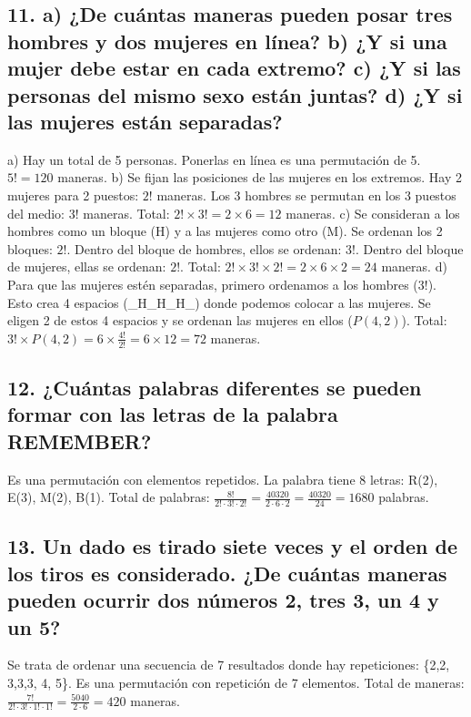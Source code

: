 \documentclass[11pt]{article}
\begin{document}
    \subsection*{11. a) ¿De cuántas maneras pueden posar tres hombres y dos mujeres en línea? b) ¿Y si una mujer debe estar en cada extremo? c) ¿Y si las personas del mismo sexo están juntas? d) ¿Y si las mujeres están separadas?}
    a) Hay un total de 5 personas. Ponerlas en línea es una permutación de 5. $5! = 120$ maneras.
    b) Se fijan las posiciones de las mujeres en los extremos. Hay 2 mujeres para 2 puestos: $2!$ maneras. Los 3 hombres se permutan en los 3 puestos del medio: $3!$ maneras. Total: $2! \times 3! = 2 \times 6 = 12$ maneras.
    c) Se consideran a los hombres como un bloque (H) y a las mujeres como otro (M). Se ordenan los 2 bloques: $2!$. Dentro del bloque de hombres, ellos se ordenan: $3!$. Dentro del bloque de mujeres, ellas se ordenan: $2!$. Total: $2! \times 3! \times 2! = 2 \times 6 \times 2 = 24$ maneras.
    d) Para que las mujeres estén separadas, primero ordenamos a los hombres ($3!$). Esto crea 4 espacios (\_H\_H\_H\_) donde podemos colocar a las mujeres. Se eligen 2 de estos 4 espacios y se ordenan las mujeres en ellos ($P(4,2)$). Total: $3! \times P(4,2) = 6 \times \frac{4!}{2!} = 6 \times 12 = 72$ maneras.

    \subsection*{12. ¿Cuántas palabras diferentes se pueden formar con las letras de la palabra REMEMBER?}
    Es una permutación con elementos repetidos. La palabra tiene 8 letras: R(2), E(3), M(2), B(1).
    Total de palabras: $\frac{8!}{2! \cdot 3! \cdot 2!} = \frac{40320}{2 \cdot 6 \cdot 2} = \frac{40320}{24} = 1680$ palabras.

    \subsection*{13. Un dado es tirado siete veces y el orden de los tiros es considerado. ¿De cuántas maneras pueden ocurrir dos números 2, tres 3, un 4 y un 5?}
    Se trata de ordenar una secuencia de 7 resultados donde hay repeticiones: \{2,2, 3,3,3, 4, 5\}. Es una permutación con repetición de 7 elementos.
    Total de maneras: $\frac{7!}{2! \cdot 3! \cdot 1! \cdot 1!} = \frac{5040}{2 \cdot 6} = 420$ maneras.
\end{document}
